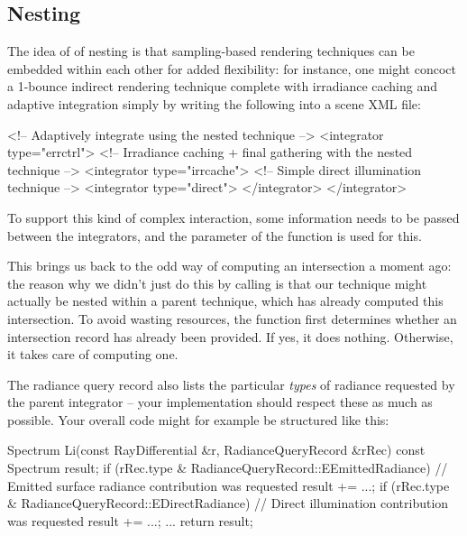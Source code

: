 \subsection{Nesting}
The idea of of nesting is that sampling-based rendering techniques can be
embedded within each other for added flexibility: for instance, one 
might concoct a  1-bounce indirect rendering technique complete with 
irradiance caching and adaptive integration simply by writing the following 
into a scene XML file:
\begin{xml}
<!-- Adaptively integrate using the nested technique -->
<integrator type="errctrl"> 
	<!-- Irradiance caching + final gathering with the nested technique -->
	<integrator type="irrcache"> 
		<!-- Simple direct illumination technique -->
		<integrator type="direct"> 
	</integrator>
</integrator>
\end{xml}
To support this kind of complex interaction, some information needs to be passed between the 
integrators, and the  parameter of the function
 is used for this.

This brings us back to the odd way of computing an intersection a moment ago: 
the reason why we didn't just do this by calling  
 is that our technique might actually be nested
within a parent technique, which has already computed this intersection.
To avoid wasting resources, the function  first 
determines whether an intersection record has already been provided. 
If yes, it does nothing. Otherwise, it takes care of computing one. 

The radiance query record also lists the particular \emph{types} of radiance requested
by the parent integrator -- your implementation should respect these as much
as possible. Your overall code might for example be structured like this:

\begin{cpp}
   Spectrum Li(const RayDifferential &r, RadianceQueryRecord &rRec) const {
	  Spectrum result;
      if (rRec.type & RadianceQueryRecord::EEmittedRadiance) {
         // Emitted surface radiance contribution was requested
		 result += ...;
	  }
      if (rRec.type & RadianceQueryRecord::EDirectRadiance) {
         // Direct illumination contribution was requested
		 result += ...;
	  }
	  ...
	  return result;
   }
\end{cpp}
